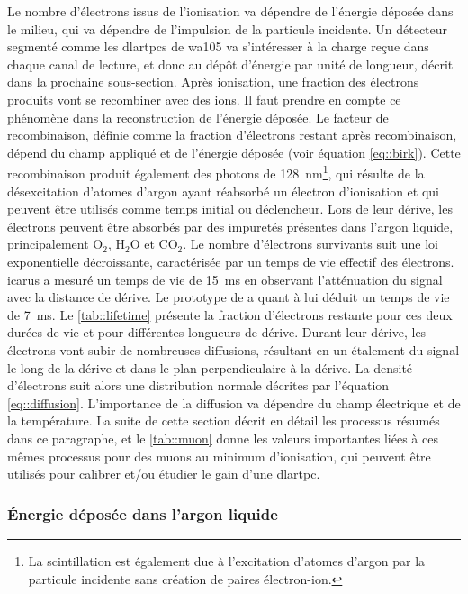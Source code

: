         Le nombre d'électrons issus de l'ionisation va dépendre de l'énergie déposée dans le milieu, qui va dépendre de l'impulsion de la particule incidente. Un détecteur segmenté comme les \glspl{dlartpc} de \gls{wa105} va s'intéresser à la charge reçue dans chaque canal de lecture, et donc au dépôt d'énergie par unité de longueur, décrit dans la prochaine sous-section. Après ionisation, une fraction des électrons produits vont se recombiner avec des ions. Il faut prendre en compte ce phénomène dans la reconstruction de l'énergie déposée. Le facteur de recombinaison, définie comme la fraction d'électrons restant après recombinaison, dépend du champ appliqué et de l'énergie déposée (voir équation \eqref{eq::birk}). Cette recombinaison produit également des photons de \SI{128}{\nano\meter}\footnote{La scintillation est également due à l'excitation d'atomes d'argon par la particule incidente sans création de paires électron-ion.}, qui résulte de la désexcitation d'atomes d'argon ayant réabsorbé un électron d'ionisation et qui peuvent être utilisés comme temps initial ou déclencheur. Lors de leur dérive, les électrons peuvent être absorbés par des impuretés présentes dans l'argon liquide, principalement O$_2$, H$_2$O et CO$_2$. Le nombre d'électrons survivants suit une loi exponentielle décroissante, caractérisée par un temps de vie effectif des électrons. \gls{icarus} a mesuré un temps de vie de \SI{15}{\milli\second}\cite{Antonello2014} en observant l'atténuation du signal avec la distance de dérive. Le prototype de \protosp{} a quant à lui déduit un temps de vie de \SI{7}{\milli\second}. Le \autoref{tab::lifetime} présente la fraction d'électrons restante pour ces deux durées de vie et pour différentes longueurs de dérive. Durant leur dérive, les électrons vont subir de nombreuses diffusions, résultant en un étalement du signal le long de la dérive et dans le plan perpendiculaire à la dérive. La densité d'électrons suit alors une distribution normale décrites par l'équation \eqref{eq::diffusion}. L'importance de la diffusion va dépendre du champ électrique et de la température. La suite de cette section décrit en détail les processus résumés dans ce paragraphe, et le \autoref{tab::muon} donne les valeurs importantes liées à ces mêmes processus pour des muons au minimum d'ionisation, qui peuvent être utilisés pour calibrer et/ou étudier le gain d'une \gls{dlartpc}. 

      \subsubsection{Énergie déposée dans l'argon liquide}

